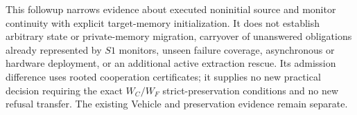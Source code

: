 This followup narrows evidence about executed noninitial source and
monitor continuity with explicit target-memory initialization. It does
not establish arbitrary state or private-memory migration, carryover of
unanswered obligations already represented by $S1$ monitors, unseen
failure coverage, asynchronous or hardware
deployment, or an additional active extraction rescue. Its admission
difference uses rooted cooperation certificates; it supplies no new
practical decision requiring the exact $W_C/W_F$ strict-preservation
conditions and no new refusal transfer. The existing Vehicle and
preservation evidence remain separate.
